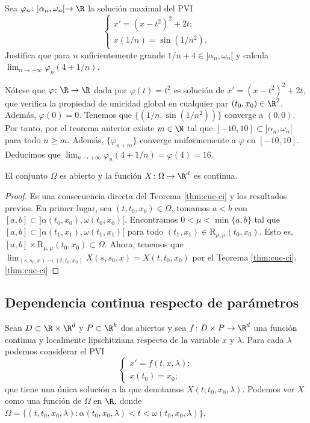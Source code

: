 \begin{ex}
  Sea $\varphi_n \colon ]\alpha_n, \omega_n[ \to \R$ la solución maximal del PVI
  \[
    \begin{cases}
      x' = (x - t^2)^2 + 2t; \\
      x(1/n) = \sin(1 / n^2).
    \end{cases}
  \]
  Justifica que para $n$ suficientemente grande $1/n + 4 \in ]\alpha_n, \omega_n[$ y calcula
  $\lim_{n\to +\infty} \varphi_n(4+1/n)$.

  Nótese que $\varphi\colon \R \to \R$ dada por $\varphi(t) = t^2$ es solución de
  $x' = (x - t^2)^2 + 2t$, que verifica la propiedad de unicidad global en cualquier par
  $(t_0, x_0) \in \R^2$. Además, $\varphi(0) = 0$. Tenemos que $\{(1/n, \sin(1 / n^2))\}$ converge a
  $(0,0)$. Por tanto, por el teorema anterior existe $m \in \N$ tal que
  $[-10,10] \subset ]\alpha_n, \omega_n[ $ para todo $n \ge m$. Además, $\{\varphi_{n+m}\}$ converge
  uniformemente a $\varphi$ en $[-10,10]$. Deducimos que
  $\lim_{n\to +\infty} \varphi_n(4+1/n) = \varphi(4) = 16$.
\end{ex}

\begin{theorem}
  \label{thm:cont-X}
  El conjunto $\Omega$ es abierto y la función $X \colon \Omega \to \R^d$ es continua.
\end{theorem}
\begin{proof}
  Es una consecuencia directa del Teorema \ref{thm:cuc-ci} y los resultados previos. En primer
  lugar, sea $(t, t_0, x_0) \in \Omega$, tomamos $a < b$ con
  $[a,b] \subset ]\alpha(t_0, x_0), \omega(t_0, x_0)[$. Encontramos $0 < \mu < \min \{a,b\}$ tal que
  $[a,b] \subset ]\alpha(t_1, x_1), \omega(t_1, x_1)[$ para todo
  $(t_1, x_1) \in \mathrm{R}_{\mu,\mu}(t_0, x_0)$. Esto es,
  $[a,b] \times \mathrm{R}_{\mu,\mu}(t_0,x_0) \subset \Omega$. Ahora, tenemos que
  $\lim_{(s,s_0,x) \to (t,t_0, x_0)} X(s,s_0,x) = X(t,t_0,x_0)$ por el Teorema
  \ref{thm:cuc-ci}.\ref{thm:cuc-ci}
\end{proof}


\subsection{Dependencia continua respecto de parámetros}

Sean $D \subset \R \times \R^d$ y $P \subset \R^k$ dos abiertos y sea $f \colon D \times P \to \R^d$
una función continua y localmente lipschitziana respecto de la variable $x$ y $\lambda$. Para cada
$\lambda$ podemos considerar el PVI
\begin{equation}
  \label{eq:pvi:parametors}
  \begin{cases}
    x' = f(t,x, \lambda); \\
    x(t_0) = x_0;
  \end{cases}
  \tag{PP}
\end{equation}
que tiene una única solución a la que denotamos $X(t; t_0, x_0, \lambda)$.  Podemos ver $X$ como una
función de $\Omega$ en $\R$, donde
$\Omega = \{(t,t_0,x_0,\lambda) : \alpha(t_0,x_0, \lambda) < t < \omega(t_0,x_0, \lambda)\}$.

